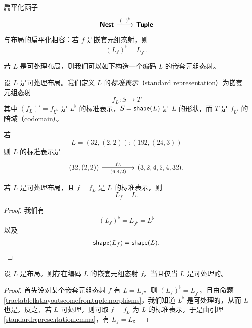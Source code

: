 \begin{observation}\label{flatlayoutcompatibility}
扁平化函子
\[ \begin{tikzcd}
\catstyle{Nest} \ar[r,"(-)^\flat"] & \catstyle{Tuple}
\end{tikzcd} \]
与布局的扁平化相容：若 $f$ 是嵌套元组态射，则
\[
(L_f)^\flat = L_{f^\flat}.
\]
\end{observation}

若 $L$ 是可处理布局，则我们可以如下构造一个编码 $L$ 的嵌套元组态射。

\begin{construction}\label{nestedtuplemorphismfromlayout}
    设 $L$ 是可处理布局。我们定义 $L$ 的{\it 标准表示}（standard representation）为嵌套元组态射
    \[f_L:S \to T\]
    其中 $(f_L)^\flat  = f_{L^\flat}$ 是 $L^\flat$ 的标准表示，$S = \mathsf{shape}(L)$ 是 $L$ 的形状，而 $T$ 是 $f_{L^\flat}$ 的陪域（codomain）。
\end{construction}

\begin{example}
    若
    \[
    L = (32,(2,2)):(192,(24,3))
    \]
    则 $L$ 的标准表示是
    \[\begin{tikzcd}
    (32,(2,2)) \ar[rr,"f_L"] \ar[rr,swap,"(6{,}4{,}2)"] & & (3,2,4,2,4,32).
    \end{tikzcd}\]
\end{example}

\begin{lemma}\label{standardrepresentationlemma}
    若 $L$ 是可处理布局，且 $f = f_L$ 是 $L$ 的标准表示，则
    \[
    L_f = L.
    \]
\end{lemma}

\begin{proof}
    我们有
    \[
    (L_f)^\flat = L_{f^\flat} = L^\flat
    \]
    以及
    \begin{align*}
        \mathsf{shape}(L_f) = \mathsf{shape}(L).
    \end{align*}
\end{proof}

\begin{proposition}\label{tractablelayoutscomefromnestedtuplemorphisms}
设 $L$ 是布局。则存在编码 $L$ 的嵌套元组态射 $f$，当且仅当 $L$ 是可处理的。
\end{proposition}

\begin{proof}
    首先设对某个嵌套元组态射 $f$ 有 $L = L_f$。则 $(L_f)^\flat = L_{f^\flat}$，且由命题 \ref{tractableflatlayoutscomefromtuplemorphisms}，我们知道 $L^\flat$ 是可处理的，从而 $L$ 也是。反之，若 $L$ 可处理，则可取 $f = f_L$ 为 $L$ 的标准表示，于是由引理 \ref{standardrepresentationlemma}，有 $L_f = L$。
\end{proof}

